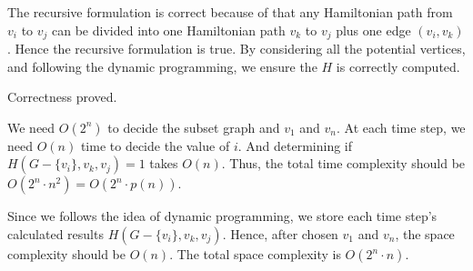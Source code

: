 The recursive formulation is correct because of that any Hamiltonian path from $v_i$ to $v_j$ can be divided into one Hamiltonian path $v_k$ to $v_j$ plus one edge $(v_i, v_k)$. Hence the recursive formulation is true. By considering all the potential vertices, and following the dynamic programming, we ensure the $H$ is correctly computed. 

Correctness proved. 


We need $O(2^n)$ to decide the subset graph and $v_1$ and $v_n$. At each time step, we need $O(n)$ time to decide the value of $i$. And determining if $ H(G-\{v_i\}, v_k, v_j)=1$ takes $O(n)$. Thus, the total time complexity should be $O(2^n \cdot n^2)=O(2^n \cdot p(n))$.

Since we follows the idea of dynamic programming, we store each time step's calculated results $ H(G-\{v_i\}, v_k, v_j)$. Hence, after chosen $v_1$ and $v_n$, the space complexity should be $O(n)$. The total space complexity is $O(2^n \cdot n)$.

